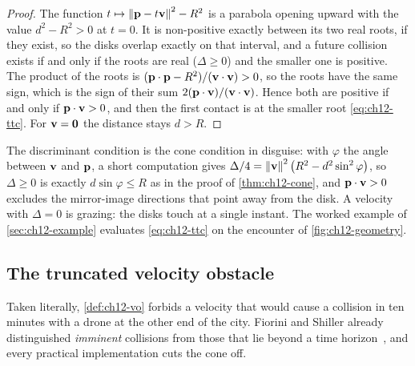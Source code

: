 \begin{proof}
The function $t \mapsto \left\lVert \mathbf{p} - t\mathbf{v} \right\rVert^2 - R^2$ is a parabola opening
upward with the value $d^2 - R^2 > 0$ at $t = 0$. It is non-positive exactly
between its two real roots, if they exist, so the disks overlap exactly on that
interval, and a future collision exists if and only if the roots are real
($\Delta \ge 0$) and the smaller one is positive. The product of the roots is
$(\mathbf{p}\cdot\mathbf{p} - R^2)/(\mathbf{v}\cdot\mathbf{v}) > 0$, so the roots have the same sign,
which is the sign of their sum $2(\mathbf{p}\cdot\mathbf{v})/(\mathbf{v}\cdot\mathbf{v})$. Hence both
are positive if and only if $\mathbf{p}\cdot\mathbf{v} > 0$, and then the first contact is
at the smaller root \cref{eq:ch12-ttc}. For $\mathbf{v} = \mathbf{0}$ the distance stays
$d > R$. \qedhere
\end{proof}

The discriminant condition is the cone condition in disguise: with
$\varphi$ the angle between $\mathbf{v}$ and $\mathbf{p}$, a short computation gives
$\Delta/4 = \left\lVert \mathbf{v} \right\rVert^2\bigl(R^2 - d^2\sin^2\varphi\bigr)$, so
$\Delta \ge 0$ is exactly $d\sin\varphi \le R$ as in the proof of
\cref{thm:ch12-cone}, and $\mathbf{p}\cdot\mathbf{v} > 0$ excludes the mirror-image
directions that point away from the disk. A velocity with $\Delta = 0$ is
grazing: the disks touch at a single instant. The worked example of
\cref{sec:ch12-example} evaluates \cref{eq:ch12-ttc} on the encounter of
\cref{fig:ch12-geometry}.

\subsection{The truncated velocity obstacle}
\label{sec:ch12-truncated}

Taken literally, \cref{def:ch12-vo} forbids a velocity that would cause a
collision in ten minutes with a drone at the other end of the city. Fiorini
and Shiller already distinguished \emph{imminent} collisions from those that
lie beyond a time horizon~\cite{fiorini1998motion}, and every practical
implementation cuts the cone off.

